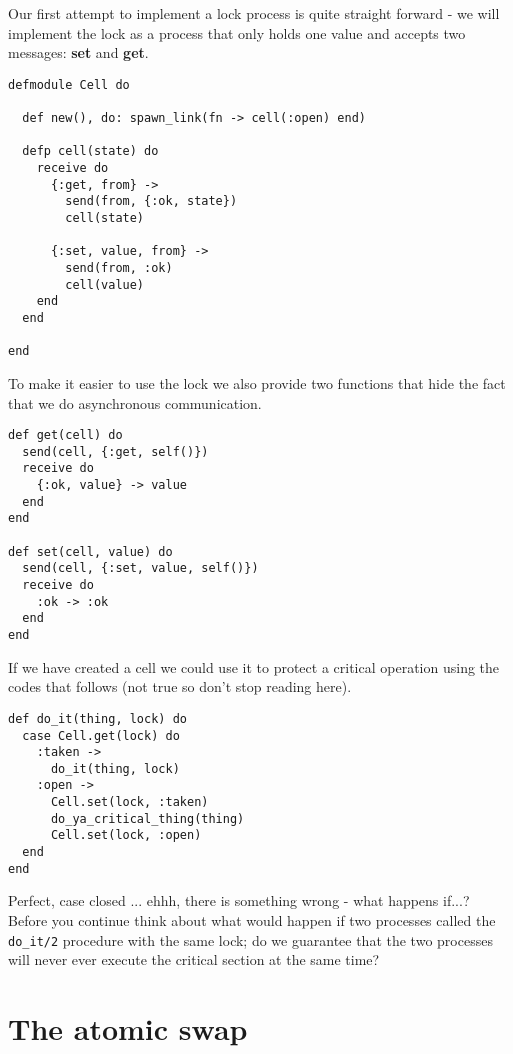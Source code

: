 \documentclass[a4paper,11pt]{article}
\begin{document}
Our first attempt to implement a lock process is quite straight forward
- we will implement the lock as a process that only holds one value
and accepts two messages: {\bf set} and {\bf get}.

\begin{verbatim}
defmodule Cell do
  
  def new(), do: spawn_link(fn -> cell(:open) end)

  defp cell(state) do
    receive do
      {:get, from} ->
        send(from, {:ok, state})
        cell(state)

      {:set, value, from} ->
        send(from, :ok)
        cell(value)
    end
  end

end
\end{verbatim}

To make it easier to use the lock we also provide two functions that
hide the fact that we do asynchronous communication.

\begin{verbatim}
def get(cell) do
  send(cell, {:get, self()})
  receive do
    {:ok, value} -> value
  end
end

def set(cell, value) do
  send(cell, {:set, value, self()})
  receive do
    :ok -> :ok
  end
end
\end{verbatim}

If we have created a cell we could use it to protect a critical
operation using the codes that follows (not true so don't stop
reading here).

\pagebreak

\begin{verbatim}
def do_it(thing, lock) do
  case Cell.get(lock) do
    :taken ->
      do_it(thing, lock)
    :open ->
      Cell.set(lock, :taken)
      do_ya_critical_thing(thing)
      Cell.set(lock, :open)
  end
end
\end{verbatim}

Perfect, case closed ... ehhh, there is something wrong - what happens
if...? Before you continue think about what would happen if two
processes called the {\tt do\_it/2} procedure with the same lock; do we
guarantee that the two processes will never ever execute the critical
section at the same time?



\section{The atomic swap}
\end{document}
